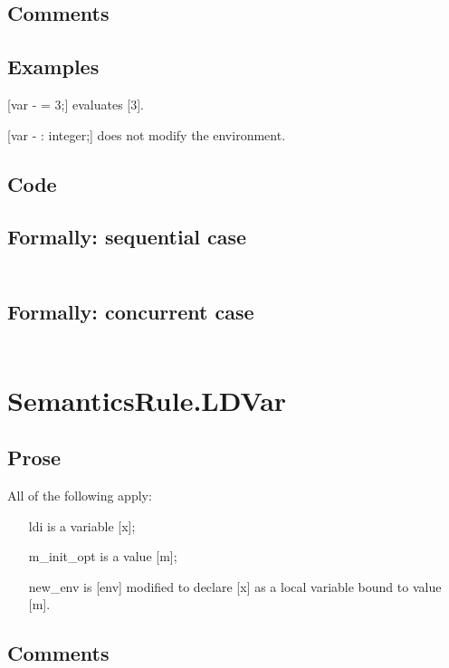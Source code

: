 \documentclass{book}
\begin{document}
    \subsection{Comments}

    \subsection{Examples}
    [var - = 3;] evaluates [3].

    [var - : integer;] does not modify the environment.

  \subsection{Code}

  \subsection{Formally: sequential case}
  \begin{align}
  \end{align} 

  \subsection{Formally: concurrent case}
  \begin{align}
  \end{align} 

\section{SemanticsRule.LDVar \label{sec:SemanticsRule.LDVar}}

    \subsection{Prose}
    All of the following apply:
    \begin{itemize}
    \item [ldi] is a variable [x];
    \item [m\_init\_opt] is a value [m];
    \item [new\_env] is [env] modified to declare [x] as a local variable bound to
      value [m].
    \end{itemize}

    \subsection{Comments}
\end{document}
